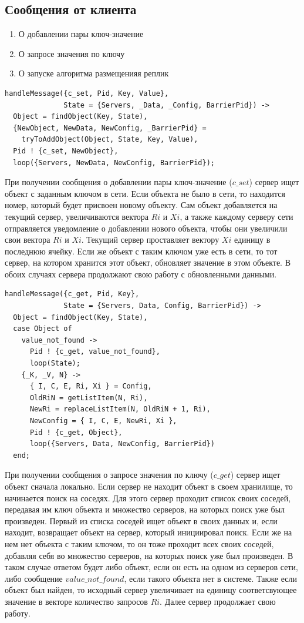 		\subsection{Сообщения от клиента}
			\begin{enumerate}
				\item О добавлении пары ключ-значение
				\item О запросе значения по ключу
				\item О запуске алгоритма размещенияя реплик	
			\end{enumerate}

			\begin{lstlisting}
handleMessage({c_set, Pid, Key, Value}, 
              State = {Servers, _Data, _Config, BarrierPid}) ->
  Object = findObject(Key, State),
  {NewObject, NewData, NewConfig, _BarrierPid} = 
    tryToAddObject(Object, State, Key, Value),
  Pid ! {c_set, NewObject}, 
  loop({Servers, NewData, NewConfig, BarrierPid});				
			\end{lstlisting}
			При получении сообщения о добавлении пары ключ-значение ($c\_set$) сервер ищет объект с заданным ключом в сети. Если объекта не было в сети, то находится номер, который будет присвоен
			новому объекту. Сам объект добавляется на текущий сервер, увеличиваются вектора $Ri$ и $Xi$, а также каждому серверу сети отправляется уведомление о добавлении нового объекта, чтобы
			они увеличили свои вектора $Ri$ и $Xi$. Текущий сервер проставляет вектору $Xi$ единицу в последнюю ячейку. Если же объект с таким ключом уже есть в сети, то тот сервер, на котором 
			хранится этот объект, обновляет значение в этом объекте. В обоих случаях сервера продолжают свою работу с обновленными данными.

			\begin{lstlisting}
handleMessage({c_get, Pid, Key}, 
              State = {Servers, Data, Config, BarrierPid}) ->
  Object = findObject(Key, State),
  case Object of 
    value_not_found ->
      Pid ! {c_get, value_not_found},
      loop(State);
    {_K, _V, N} ->
      { I, C, E, Ri, Xi } = Config,    
      OldRiN = getListItem(N, Ri),
      NewRi = replaceListItem(N, OldRiN + 1, Ri),
      NewConfig = { I, C, E, NewRi, Xi },
      Pid ! {c_get, Object},
      loop({Servers, Data, NewConfig, BarrierPid})
  end;				
			\end{lstlisting}
			При получении сообщения о запросе значения по ключу ($c\_get$) сервер ищет объект сначала локально. Если сервер не находит объект в своем хранилище, то начинается поиск на соседях. 
			Для этого сервер проходит список своих соседей, передавая им ключ объекта и множество серверов, на которых поиск уже был произведен. Первый из списка соседей ищет объект в своих данных
			и, если находит, возвращает объект на сервер, который инициировал поиск. Если же на нем нет объекта с таким ключом, то он тоже проходит всех своих соседей, добавляя себя во множество
			серверов, на которых поиск уже был произведен. В таком случае ответом будет либо объект, если он есть на одном из серверов сети, либо сообщение $value\_not\_found$, если такого объекта 
			нет в системе. Также если объект был найден, то исходный сервер увеличивает на единицу соответсвующее значение в векторе количество запросов $Ri$. Далее сервер продолжает свою работу.

